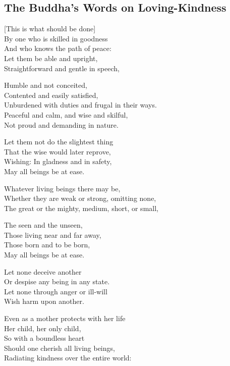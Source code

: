\subsection{The Buddha's Words on Loving-Kindness}

\begin{leader}
\end{leader}


[This is what should be done]\\
By one who is skilled in goodness\\
And who knows the path of peace:\\
Let them be able and upright,\\
Straightforward and gentle in speech,

Humble and not conceited,\\
Contented and easily satisfied,\\
Unburdened with duties and frugal in their ways.\\
Peaceful and calm, and wise and skilful,\\
Not proud and demanding in nature.

Let them not do the slightest thing\\
That the wise would later reprove,\\
Wishing: In gladness and in safety,\\
May all beings be at ease.

Whatever living beings there may be,\\
Whether they are weak or strong, omitting none,\\
The great or the mighty, medium, short, or small,

The seen and the unseen,\\
Those living near and far away,\\
Those born and to be born,\\
May all beings be at ease.

Let none deceive another\\
Or despise any being in any state.\\
Let none through anger or ill-will\\
Wish harm upon another.

Even as a mother protects with her life\\
Her child, her only child,\\
So with a boundless heart\\
Should one cherish all living beings,\\
Radiating kindness over the entire world:

